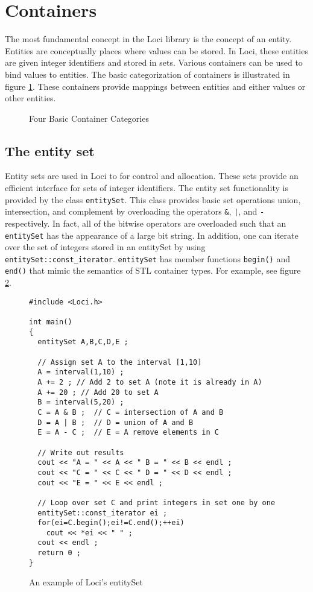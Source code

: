 \documentclass{article}
\begin{document}
\section{Containers}

The most fundamental concept in the Loci library is the concept of an
entity.  Entities are conceptually places where values can be stored.
In Loci, these entities are given integer identifiers and stored in
sets.  Various containers can be used to bind values to entities.  The
basic categorization of containers is illustrated in figure
\ref{constructs}.  These containers provide mappings between entities
and either values or other entities.

\begin{figure}[htbp]
  \centerline{ \epsfxsize=5.5in }
 \caption{Four Basic Container Categories}
 \label{constructs}
\end{figure}

\subsection{The entity set}

Entity sets are used in Loci to for control and allocation.  These
sets provide an efficient interface for sets of integer identifiers.
The entity set functionality is provided by the class {\tt entitySet}.
This class provides basic set operations union, intersection, and
complement by overloading the operators {\tt \&}, {\tt |}, and {\tt -}
respectively.  In fact, all of the bitwise operators are overloaded
such that an {\tt entitySet} has the appearance of a large bit string.
In addition, one can iterate over the set of integers stored in an
entitySet by using {\tt entitySet::const\_iterator}.  {\tt entitySet}
has member functions {\tt begin()} and {\tt end()} that mimic the
semantics of STL container types.  For example, see figure
\ref{entityset}.

\begin{figure}[htbp]
\begin{verbatim}
#include <Loci.h>

int main()
{
  entitySet A,B,C,D,E ;

  // Assign set A to the interval [1,10] 
  A = interval(1,10) ;
  A += 2 ; // Add 2 to set A (note it is already in A)
  A += 20 ; // Add 20 to set A
  B = interval(5,20) ;
  C = A & B ;  // C = intersection of A and B
  D = A | B ;  // D = union of A and B
  E = A - C ;  // E = A remove elements in C

  // Write out results
  cout << "A = " << A << " B = " << B << endl ;
  cout << "C = " << C << " D = " << D << endl ;
  cout << "E = " << E << endl ;

  // Loop over set C and print integers in set one by one
  entitySet::const_iterator ei ;
  for(ei=C.begin();ei!=C.end();++ei)
    cout << *ei << " " ;
  cout << endl ;
  return 0 ;
}
\end{verbatim}
 \caption{An example of Loci's entitySet}
 \label{entityset}
\end{figure}
\end{document}
